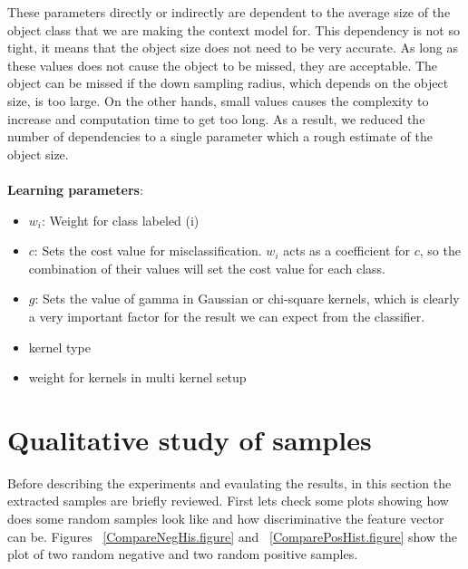These parameters directly or indirectly are dependent to the average size of the object class that we are making the context model
for. 
This dependency is not so tight, it means that the object size does not need to be very accurate. 
As long as these values does not cause the object to be missed, they are acceptable.
The object can be missed if the down sampling radius, which depends on the object size, is too large. 
On the other hands, small values causes the complexity to increase and computation time to get too long.  
As a result, we reduced the number of dependencies to a single parameter which a rough estimate of the object size.\\
\\
{\bf Learning parameters}:
\begin{itemize}
 \item $w_i$: Weight for class labeled (i)
 \item $c$: Sets the cost value for misclassification.
 $w_i$ acts as a coefficient for $c$, so the combination of their values will set the cost value for each class.
 \item $g$: Sets the value of gamma in Gaussian or chi-square kernels, which is clearly a very important factor for the result we can 
expect from the classifier. 
 \item kernel type
 \item weight for kernels in multi kernel setup
\end{itemize}


\section{Qualitative study of samples}
\label{QStudy.ssec}

Before describing the experiments and evaulating the results, in this section the extracted samples are briefly reviewed. First lets check some plots showing how does some random samples look like and how discriminative the feature vector  
can be.
Figures ~\ref{CompareNegHis.figure} and ~\ref{ComparePosHist.figure} show the plot of two random negative and two random 
positive samples.   

